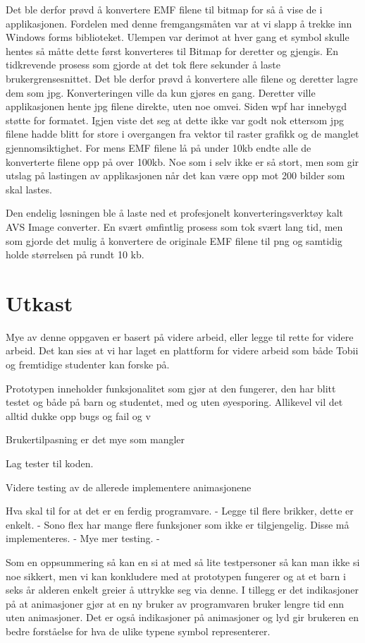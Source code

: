 {Det ble derfor prøvd å konvertere EMF filene til bitmap for så å vise de i applikasjonen. Fordelen med denne fremgangsmåten var at vi slapp å trekke inn Windows forms biblioteket. Ulempen var derimot at hver gang et symbol skulle hentes så måtte dette først konverteres til Bitmap for deretter og gjengis. En tidkrevende prosess som gjorde at det tok flere sekunder å laste brukergrensesnittet. Det ble derfor prøvd å konvertere alle filene og deretter lagre dem som jpg. Konverteringen ville da kun gjøres en gang. Deretter ville applikasjonen hente jpg filene direkte, uten noe omvei. Siden wpf har innebygd støtte for formatet. Igjen viste det seg at dette ikke var godt nok ettersom jpg filene hadde blitt for store i overgangen fra vektor til raster grafikk og de manglet gjennomsiktighet. For mens EMF filene lå på under 10kb endte alle de konverterte filene opp på over 100kb. Noe som i selv ikke er så stort, men som gir utslag på lastingen av applikasjonen når det kan være opp mot 200 bilder som skal lastes. 
 
 
Den endelig løsningen ble å laste ned et profesjonelt konverteringsverktøy kalt AVS Image converter. En svært ømfintlig prosess som tok svært lang tid, men som gjorde det mulig å konvertere de originale EMF filene til png og samtidig holde størrelsen på rundt 10 kb. 



\section{Utkast}
Mye av denne oppgaven er basert på videre arbeid, eller legge til rette for videre arbeid. Det kan sies at vi har laget en plattform for videre arbeid som både Tobii og fremtidige studenter kan forske på.


Prototypen inneholder funksjonalitet som gjør at den fungerer, den har blitt testet og både på barn og studentet, med og uten øyesporing. Allikevel vil det alltid dukke opp bugs og fail og v

Brukertilpasning er det mye som mangler

Lag tester til koden. 

Videre testing av de allerede implementere animasjonene

Hva skal til for at det er en ferdig programvare.
    - Legge til flere brikker, dette er enkelt.
    - Sono flex har mange flere funksjoner som ikke er tilgjengelig. Disse må implementeres. 
    - Mye mer testing.
    - 


Som en oppsummering så kan en si at med så lite testpersoner så kan man ikke si noe sikkert, men vi kan konkludere med at prototypen fungerer og at et barn i seks år alderen enkelt greier å uttrykke seg via denne. I tillegg er det indikasjoner på at animasjoner gjør at en ny bruker av programvaren bruker lengre tid enn uten animasjoner. Det er også indikasjoner på animasjoner og lyd gir brukeren en bedre forståelse for hva de ulike typene symbol representerer.  

}
